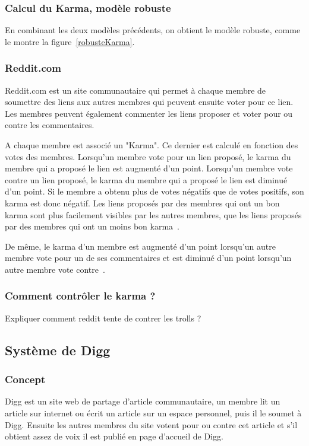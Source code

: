 \documentclass[a4paper, 11pt]{article} %
\begin{document}
\subsubsection{Calcul du Karma, modèle robuste}
En combinant les deux modèles précédents, on obtient le modèle robuste, comme le montre la figure~\ref{robusteKarma}. 

\subsubsection{Reddit.com}
Reddit.com est un site communautaire qui permet à chaque membre de soumettre des liens aux autres membres qui peuvent ensuite voter pour ce lien. Les membres peuvent également commenter les liens proposer et voter pour ou contre les commentaires.

A chaque membre est associé un "Karma". Ce dernier est calculé en fonction des votes des membres. Lorsqu'un membre vote pour un lien proposé, le karma du membre qui a proposé le lien est augmenté d'un point. Lorsqu'un membre vote contre un lien proposé, le karma du membre qui a proposé le lien est diminué d'un point. Si le membre a obtenu plus de votes négatifs que de votes positifs, son karma est donc négatif. Les liens proposés par des membres qui ont un bon karma sont plus facilement visibles par les autres membres, que les liens proposés par des membres qui ont un moins bon karma~\cite{RedditTroll}.

De même, le karma d'un membre est augmenté d'un point lorsqu'un autre membre vote pour un de ses commentaires et est diminué d'un point lorsqu'un autre membre vote contre~\cite{RedditTroll}.

\subsubsection{Comment contrôler le karma ?}
Expliquer comment reddit tente de contrer les trolls ?


\subsection{Système de Digg}
\subsubsection{Concept}
Digg est un site web de partage d'article communautaire, un membre lit un article sur internet ou écrit un article sur un espace personnel, puis il le soumet à Digg.
Ensuite les autres membres du site votent pour ou contre cet article et s'il obtient assez de voix il est publié en page d'accueil de Digg.
\end{document}
